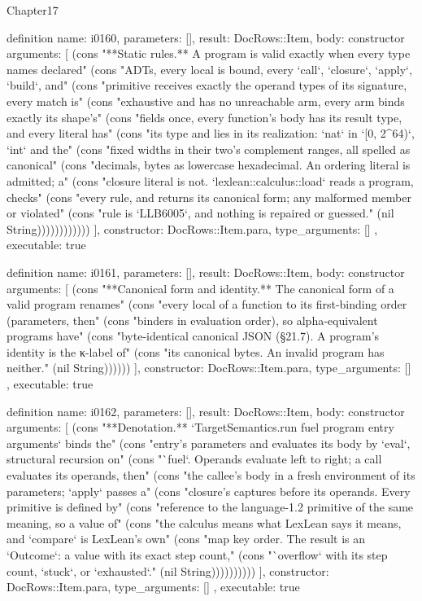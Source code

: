 \begin{lexlean}{Chapter17}
\begin{semanticmodule}
definition{
  name: i0160,
  parameters: [],
  result: DocRows::Item,
  body: constructor{
    arguments: [
      (cons "**Static rules.** A program is valid exactly when every type names declared" (cons "ADTs, every local is bound, every `call`, `closure`, `apply`, `build`, and" (cons "primitive receives exactly the operand types of its signature, every match is" (cons "exhaustive and has no unreachable arm, every arm binds exactly its shape's" (cons "fields once, every function's body has its result type, and every literal has" (cons "its type and lies in its realization: `nat` in `[0, 2^64)`, `int` and the" (cons "fixed widths in their two's complement ranges, all spelled as canonical" (cons "decimals, bytes as lowercase hexadecimal. An ordering literal is admitted; a" (cons "closure literal is not. `lexlean::calculus::load` reads a program, checks" (cons "every rule, and returns its canonical form; any malformed member or violated" (cons "rule is `LLB6005`, and nothing is repaired or guessed." (nil String))))))))))))
    ],
    constructor: DocRows::Item.para,
    type_arguments: []
  },
  executable: true
}

definition{
  name: i0161,
  parameters: [],
  result: DocRows::Item,
  body: constructor{
    arguments: [
      (cons "**Canonical form and identity.** The canonical form of a valid program renames" (cons "every local of a function to its first-binding order (parameters, then" (cons "binders in evaluation order), so alpha-equivalent programs have" (cons "byte-identical canonical JSON (§21.7). A program's identity is the κ-label of" (cons "its canonical bytes. An invalid program has neither." (nil String))))))
    ],
    constructor: DocRows::Item.para,
    type_arguments: []
  },
  executable: true
}

definition{
  name: i0162,
  parameters: [],
  result: DocRows::Item,
  body: constructor{
    arguments: [
      (cons "**Denotation.** `TargetSemantics.run fuel program entry arguments` binds the" (cons "entry's parameters and evaluates its body by `eval`, structural recursion on" (cons "`fuel`. Operands evaluate left to right; a call evaluates its operands, then" (cons "the callee's body in a fresh environment of its parameters; `apply` passes a" (cons "closure's captures before its operands. Every primitive is defined by" (cons "reference to the language-1.2 primitive of the same meaning, so a value of" (cons "the calculus means what LexLean says it means, and `compare` is LexLean's own" (cons "map key order. The result is an `Outcome`: a value with its exact step count," (cons "`overflow` with its step count, `stuck`, or `exhausted`." (nil String))))))))))
    ],
    constructor: DocRows::Item.para,
    type_arguments: []
  },
  executable: true
}


\end{semanticmodule}
\end{lexlean}
